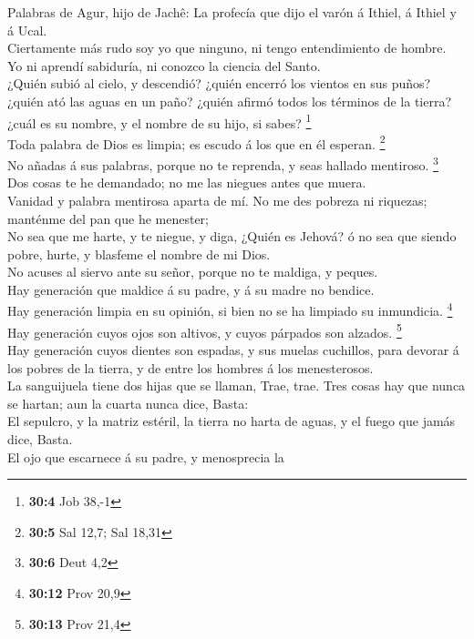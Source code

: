 Palabras de Agur, hijo de Jachê: La profecía que dijo el
varón á Ithiel, á Ithiel y á Ucal.\\
 Ciertamente más rudo soy yo que ninguno, ni tengo
entendimiento de hombre.\\
 Yo ni aprendí sabiduría, ni conozco la ciencia del Santo.\\
 ¿Quién subió al cielo, y descendió? ¿quién encerró los
vientos en sus puños? ¿quién ató las aguas en un paño? ¿quién afirmó
todos los términos de la tierra? ¿cuál es su nombre, y el nombre de su
hijo, si sabes? \footnote{\textbf{30:4} Job 38,-1}\\
 Toda palabra de Dios es limpia; es escudo á los que en él
esperan. \footnote{\textbf{30:5} Sal 12,7; Sal 18,31}\\
 No añadas á sus palabras, porque no te reprenda, y seas
hallado mentiroso. \footnote{\textbf{30:6} Deut 4,2}\\
 Dos cosas te he demandado; no me las niegues antes que
muera.\\
 Vanidad y palabra mentirosa aparta de mí. No me des pobreza
ni riquezas; manténme del pan que he menester;\\
 No sea que me harte, y te niegue, y diga, ¿Quién es Jehová?
ó no sea que siendo pobre, hurte, y blasfeme el nombre de mi Dios.\\
 No acuses al siervo ante su señor, porque no te maldiga, y
peques.\\
 Hay generación que maldice á su padre, y á su madre no
bendice.\\
 Hay generación limpia en su opinión, si bien no se ha
limpiado su inmundicia. \footnote{\textbf{30:12} Prov 20,9}\\
 Hay generación cuyos ojos son altivos, y cuyos párpados
son alzados. \footnote{\textbf{30:13} Prov 21,4}\\
 Hay generación cuyos dientes son espadas, y sus muelas
cuchillos, para devorar á los pobres de la tierra, y de entre los
hombres á los menesterosos.\\
 La sanguijuela tiene dos hijas que se llaman, Trae, trae.
Tres cosas hay que nunca se hartan; aun la cuarta nunca dice, Basta:\\
 El sepulcro, y la matriz estéril, la tierra no harta de
aguas, y el fuego que jamás dice, Basta.\\
 El ojo que escarnece á su padre, y menosprecia la
